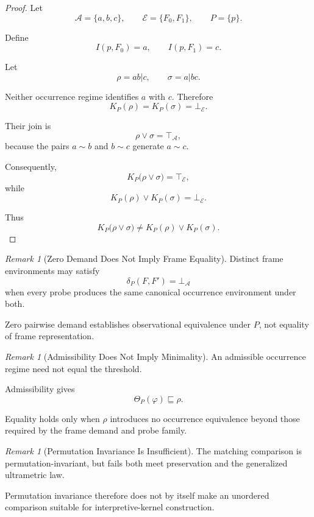 \documentclass[11pt]{article}
\theoremstyle{plain}
\theoremstyle{definition}
\theoremstyle{remark}
\newtheorem{remark}[theorem]{Remark}
\begin{document}
\begin{proof}
  Let
  \[
    \mathcal{A}
    =
    \{a,b,c\},
    \qquad
    \mathcal{E}
    =
    \{F_0,F_1\},
    \qquad
    P
    =
    \{p\}.
  \]

  Define
  \[
    I(p,F_0)=a,
    \qquad
    I(p,F_1)=c.
  \]

  Let
  \[
    \rho
    =
    ab|c,
    \qquad
    \sigma
    =
    a|bc.
  \]

  Neither occurrence regime identifies
  \(a\) with \(c\).
  Therefore
  \[
    K_P(\rho)
    =
    K_P(\sigma)
    =
    \bot_{\mathcal{E}}.
  \]

  Their join is
  \[
    \rho\vee\sigma
    =
    \top_{\mathcal{A}},
  \]
  because the pairs \(a\sim b\)
  and \(b\sim c\)
  generate \(a\sim c\).

  Consequently,
  \[
    K_P
    \bigl(
    \rho\vee\sigma
    \bigr)
    =
    \top_{\mathcal{E}},
  \]
  while
  \[
    K_P(\rho)
    \vee
    K_P(\sigma)
    =
    \bot_{\mathcal{E}}.
  \]

  Thus
  \[
    K_P
    \bigl(
    \rho\vee\sigma
    \bigr)
    \neq
    K_P(\rho)
    \vee
    K_P(\sigma).
  \]
\end{proof}

\begin{remark}[Zero Demand Does Not Imply Frame Equality]
  \label{ik.rem.zero-not-equality}
  Distinct frame environments may satisfy
  \[
    \delta_P(F,F')
    =
    \bot_{\mathcal{A}}
  \]
  when every probe produces
  the same canonical occurrence environment
  under both.

  Zero pairwise demand establishes
  observational equivalence under \(P\),
  not equality of frame representation.
\end{remark}

\begin{remark}[Admissibility Does Not Imply Minimality]
  \label{ik.rem.admissible-not-minimal}
  An admissible occurrence regime
  need not equal the threshold.

  Admissibility gives
  \[
    \Theta_P(\varphi)
    \sqsubseteq
    \rho.
  \]

  Equality holds only when \(\rho\)
  introduces no occurrence equivalence
  beyond those required
  by the frame demand and probe family.
\end{remark}

\begin{remark}[Permutation Invariance Is Insufficient]
  \label{ik.rem.permutation-insufficient}
  The matching comparison is permutation-invariant,
  but fails both meet preservation
  and the generalized ultrametric law.

  Permutation invariance therefore does not by itself
  make an unordered comparison suitable
  for interpretive-kernel construction.
\end{remark}
\end{document}
